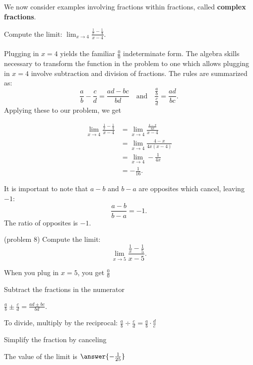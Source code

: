 \documentclass[handout]{ximera}
\begin{document}
We now consider examples involving fractions within fractions, called \textbf{complex fractions}.




\begin{example}[example 8]
Compute the limit: $\displaystyle{\lim_{x \to 4} \frac{\frac{1}{x} - \frac{1}{4}}{x-4}}.$ \\
\\
Plugging in $x=4$ yields the familiar $\frac00$ indeterminate form. The algebra skills necessary to transform the 
function in the problem to one which allows plugging in $x=4$ involve subtraction and division of fractions. 
The rules are summarized as:
\[\frac{a}{b} - \frac{c}{d} = \frac{ad-bc}{bd} \quad \text{and} \quad \frac{\frac{a}{b}}{\frac{c}{d}} = \frac{ad}{bc}.\]
Applying these to our problem, we get

\begin{align*}
\lim_{x \to 4} \frac{\frac{1}{x} - \frac{1}{4}}{x-4} &= \lim_{x \to 4} \frac{\frac{4-x}{4x}}{x-4}\\[.4 em]
&=\lim_{x \to 4} \frac{4-x}{4x(x-4)}\\[.4 em]
&= \lim_{x \to 4} -\frac{1}{4x} \\[.4 em]
&= -\frac{1}{16}.
\end{align*}

It is important to note that $a-b$ and $b-a$ are opposites which cancel, leaving $-1$: 
\[ \frac{a-b}{b-a} = -1. \]
The ratio of opposites is $-1$.
\end{example}



\begin{problem}(problem 8)
  Compute the limit:
  \[
  \lim_{x \to 5} \frac{\frac{1}{x} - \frac{1}{5}}{x-5}.
  \]
  
    \begin{hint}
      When you plug in $x = 5$, you get $\frac00$
    \end{hint}
    \begin{hint}
      Subtract the fractions in the numerator
    \end{hint}
    \begin{hint}
      $\frac{a}{b} \pm \frac{c}{d} = \frac{ad \pm bc}{bd}$.
    \end{hint}
    \begin{hint}
      To divide, multiply by the reciprocal: $\frac{a}{b} \div \frac{c}{d} = \frac{a}{b} \cdot \frac{d}{c}$ 
    \end{hint}
    \begin{hint}
      Simplify the fraction by canceling 
    \end{hint}
		The value of the limit is
		 $\answer{-\frac{1}{25}}$
		
\end{problem}
\end{document}
